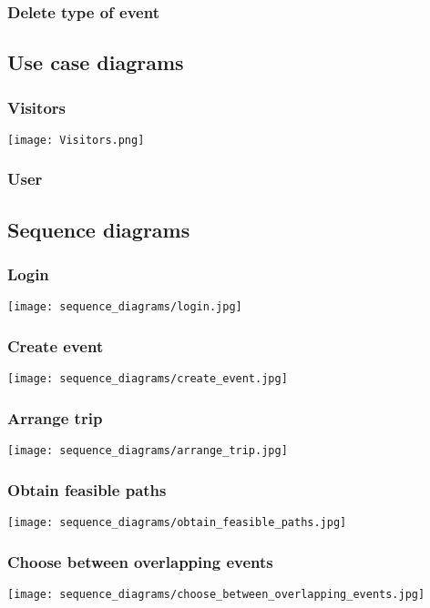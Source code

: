 		\subsubsection{Delete type of event}
		
		
\subsection{Use case diagrams}
\label{subsect:Use case diagrams}
	\subsubsection{Visitors}
		\texttt{[image: Visitors.png]}
	\subsubsection{User}
		\noindent{}
		
\subsection{Sequence diagrams}
\label{subsect:Sequence diagrams}
	\subsubsection{Login}
		\texttt{[image: sequence\_diagrams/login.jpg]}
	\subsubsection{Create event}
		\texttt{[image: sequence\_diagrams/create\_event.jpg]}
	\subsubsection{Arrange trip}
		\texttt{[image: sequence\_diagrams/arrange\_trip.jpg]}
	\subsubsection{Obtain feasible paths}
		\texttt{[image: sequence\_diagrams/obtain\_feasible\_paths.jpg]}
	\subsubsection{Choose between overlapping events}
		\texttt{[image: sequence\_diagrams/choose\_between\_overlapping\_events.jpg]}